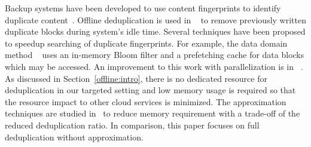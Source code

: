 Backup systems have been developed to use content fingerprints to identify duplicate
content~\cite{venti02,Rhea2008}.
Offline deduplication is
used in ~\cite{EMC,NetAppOffline} to remove previously written duplicate blocks during system's idle time.
Several techniques have been proposed to speedup searching of duplicate
fingerprints. For example, the data domain method ~\cite{bottleneck08}
uses  an in-memory Bloom filter and a prefetching cache for data blocks  which may be
accessed.  An improvement to this work with parallelization is in ~\cite{MAD210,DEBAR}.
As discussed in Section~\ref{offline:intro},
there is no dedicated resource for deduplication in our targeted setting and low memory usage
 is required so that the resource impact to other cloud services is minimized.
The approximation techniques are studied in~\cite{extreme_binning09,Guo2011}
to reduce memory requirement with a trade-off of the reduced deduplication ratio.
In comparison, this paper focuses on  full deduplication without approximation.

